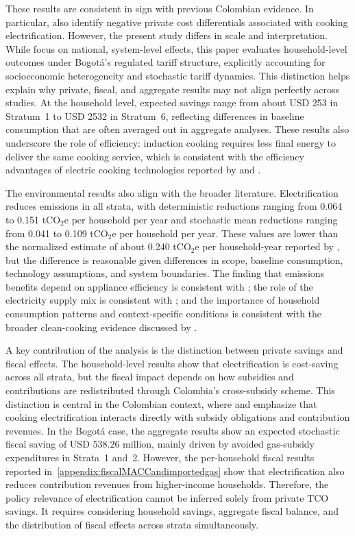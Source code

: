 \documentclass[authoryear,preprint,review,10pt]{elsarticle}
\begin{document}
These results are consistent in sign with previous Colombian evidence. In particular, \citet{cabrales2023costos} also identify negative private cost differentials associated with cooking electrification. However, the present study differs in scale and interpretation. While \citet{cabrales2023costos} focus on national, system-level effects, this paper evaluates household-level outcomes under Bogotá's regulated tariff structure, explicitly accounting for socioeconomic heterogeneity and stochastic tariff dynamics. This distinction helps explain why private, fiscal, and aggregate results may not align perfectly across studies. At the household level, expected savings range from about USD 253 in Stratum~1 to USD 2532 in Stratum~6, reflecting differences in baseline consumption that are often averaged out in aggregate analyses. These results also underscore the role of efficiency: induction cooking requires less final energy to deliver the same cooking service, which is consistent with the efficiency advantages of electric cooking technologies reported by \citet{im2020} and \citet{scott2024energy}.

The environmental results also align with the broader literature. Electrification reduces emissions in all strata, with deterministic reductions ranging from 0.064 to 0.151 tCO$_2$e per household per year and stochastic mean reductions ranging from 0.041 to 0.109 tCO$_2$e per household per year. These values are lower than the normalized estimate of about 0.240 tCO$_2$e per household-year reported by \citet{cabrales2023costos}, but the difference is reasonable given differences in scope, baseline consumption, technology assumptions, and system boundaries. The finding that emissions benefits depend on appliance efficiency is consistent with \citet{scott2024energy}; the role of the electricity supply mix is consistent with \citet{im2020}; and the importance of household consumption patterns and context-specific conditions is consistent with the broader clean-cooking evidence discussed by \citet{floess2023}.

A key contribution of the analysis is the distinction between private savings and fiscal effects. The household-level results show that electrification is cost-saving across all strata, but the fiscal impact depends on how subsidies and contributions are redistributed through Colombia's cross-subsidy scheme. This distinction is central in the Colombian context, where \citet{cabrales2023costos} and \citet{cabrales2025subsidios_gas} emphasize that cooking electrification interacts directly with subsidy obligations and contribution revenues. In the Bogotá case, the aggregate results show an expected stochastic fiscal saving of USD $538.26$ million, mainly driven by avoided gas-subsidy expenditures in Strata~1 and~2. However, the per-household fiscal results reported in~\ref{appendix:fiscalMACCandimportedgas} show that electrification also reduces contribution revenues from higher-income households. Therefore, the policy relevance of electrification cannot be inferred solely from private TCO savings. It requires considering household savings, aggregate fiscal balance, and the distribution of fiscal effects across strata simultaneously.
\end{document}
